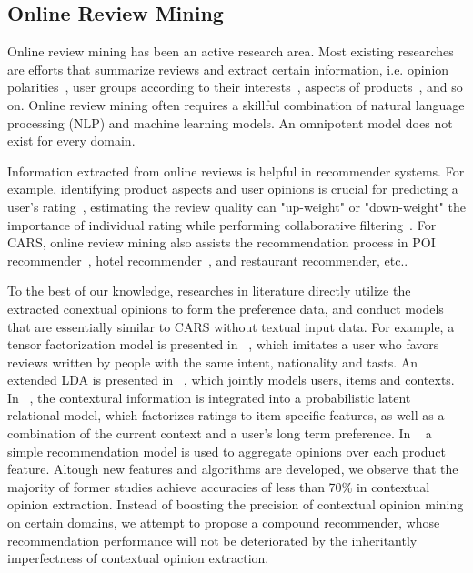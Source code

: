 \documentclass[preprint,12pt]{elsarticle}
\begin{document}
\subsection{Online Review Mining}

Online review  mining has been an active research area. Most existing researches are efforts that summarize reviews and extract certain information, i.e. opinion polarities~\cite{Liu2005Opinion}, user groups according to their interests~\cite{Si2014Users}, aspects of products~\cite{Moghaddam2013FLDA}, and so on. Online review mining often requires a skillful combination of natural language processing (NLP) and machine learning models. An omnipotent model does not exist for every domain. 


Information extracted from online reviews is helpful in recommender systems. For example, identifying product aspects and user opinions is crucial for predicting a user's rating~\cite{Qu2010Bag}, estimating the review quality can "up-weight" or "down-weight" the importance of individual rating while performing collaborative filtering~\cite{Raghavan2012Review}. For CARS, online review mining also assists the recommendation process in POI recommender~\cite{Biancalana2013Approach}, hotel recommender~\cite{Levi2012Finding}, and restaurant recommender\cite{Li2010Contextual}, etc..  


To the best of our knowledge, researches in literature directly utilize the extracted conextual opinions to form the preference data, and conduct models that are essentially similar to CARS without textual input data. For example, a tensor factorization model is presented in ~\cite{Levi2012Finding}, which imitates a user who favors reviews written by people with the same intent, nationality and tasts.  An extended LDA is presented in ~\cite{Hariri2013Query}, which jointly models users, items and contexts. In ~\cite{Li2010Contextual}, the contextural information is integrated into a probabilistic latent relational model, which factorizes ratings to item specific features, as well as a combination of the current context and a user's long term preference. In ~\cite{Liu2013Combining} a simple recommendation model is used to aggregate opinions over each product feature. Altough new features and algorithms are developed, we observe that the majority of former studies achieve accuracies of less than 70$\%$ in contextual opinion extraction. Instead of boosting the precision of contextual opinion mining on certain domains, we attempt to propose a compound recommender, whose recommendation performance will not be deteriorated by the inheritantly imperfectness of contextual opinion extraction.
\end{document}
